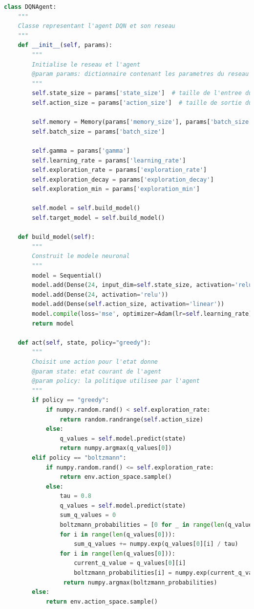 \documentclass[10pt,a4paper]{article}
\begin{document}
\begin{lstlisting}[language=Python, caption=Programme principal de l'agent utilisant l'expérience replay]
class DQNAgent:
    """
    Classe representant l'agent DQN et son reseau
    """
    def __init__(self, params):
        """
        Initialise le reseau et l'agent
        @param params: dictionnaire contenant les parametres du reseau et de l'agent
        """
        self.state_size = params['state_size']  # taille de l'entree du reseau
        self.action_size = params['action_size']  # taille de sortie du reseau

        self.memory = Memory(params['memory_size'], params['batch_size'])  # memoire pour l'experience replay
        self.batch_size = params['batch_size']

        self.gamma = params['gamma']
        self.learning_rate = params['learning_rate']
        self.exploration_rate = params['exploration_rate']
        self.exploration_decay = params['exploration_decay']
        self.exploration_min = params['exploration_min']

        self.model = self.build_model()
        self.target_model = self.build_model()

    def build_model(self):
        """
        Construit le modele neuronal
        """
        model = Sequential()
        model.add(Dense(24, input_dim=self.state_size, activation='relu'))
        model.add(Dense(24, activation='relu'))
        model.add(Dense(self.action_size, activation='linear'))
        model.compile(loss='mse', optimizer=Adam(lr=self.learning_rate))
        return model

    def act(self, state, policy="greedy"):
        """
        Choisit une action pour l'etat donne
        @param state: etat courant de l'agent
        @param policy: la politique utilisee par l'agent
        """
        if policy == "greedy":
            if numpy.random.rand() < self.exploration_rate:
                return random.randrange(self.action_size)
            else:
                q_values = self.model.predict(state)
                return numpy.argmax(q_values[0])
        elif policy == "boltzmann":
            if numpy.random.rand() <= self.exploration_rate:
                return env.action_space.sample()
            else:
                tau = 0.8
                q_values = self.model.predict(state)
                sum_q_values = 0
                boltzmann_probabilities = [0 for _ in range(len(q_values[0]))]
                for i in range(len(q_values[0])):
                    sum_q_values += numpy.exp(q_values[0][i] / tau)
                for i in range(len(q_values[0])):
                    current_q_value = q_values[0][i]
                    boltzmann_probabilities[i] = numpy.exp(current_q_value/tau) / sum_q_values
                 return numpy.argmax(boltzmann_probabilities)
        else:
            return env.action_space.sample()


\end{lstlisting}
\end{document}
